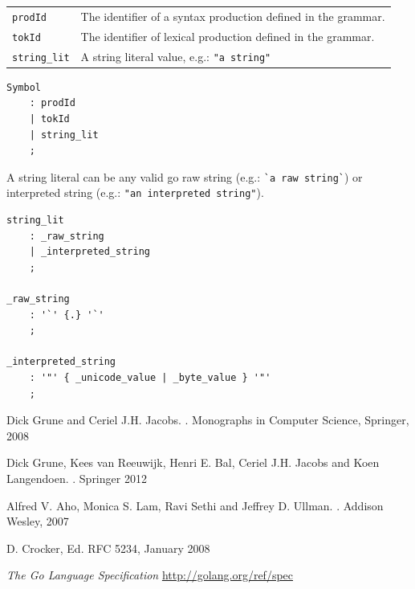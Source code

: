 \documentclass[12pt]{article}
\begin{document}
\begin{longtable}{ll}
	\verb|prodId| & The identifier of a syntax production defined in the grammar. \\
	\verb|tokId| & The identifier of lexical production defined in the grammar. \\
	\verb|string_lit| & A string literal value, e.g.: \verb|"a string"| \\
\end{longtable}

\begin{Verbatim}[frame=single]
Symbol
    : prodId
    | tokId
    | string_lit
    ;
\end{Verbatim}

A string literal can be any valid go raw string (e.g.: \verb|`a raw string`|) or interpreted string (e.g.: \verb|"an interpreted string"|).

\begin{Verbatim}[frame=single]
string_lit
    : _raw_string
    | _interpreted_string
    ;

_raw_string
    : '`' {.} '`'
    ;

_interpreted_string
    : '"' { _unicode_value | _byte_value } '"'
    ;
\end{Verbatim}




\nocite{Parsing, Modern Compiler Design, Dragon Book, ABNF}
\begin{thebibliography}{99}
	Dick Grune and Ceriel J.H. Jacobs.
	.
	\newblock Monographs in Computer Science, Springer, 2008

	Dick Grune, Kees van Reeuwijk, Henri E. Bal, Ceriel J.H. Jacobs and Koen Langendoen.
	.
	\newblock Springer 2012

	Alfred V. Aho, Monica S. Lam, Ravi Sethi and Jeffrey D. Ullman.
	.
	\newblock Addison Wesley, 2007

	D. Crocker, Ed.
	\newblock RFC 5234, January 2008

	{\em The Go Language Specification}
	\newblock \url{http://golang.org/ref/spec}


\end{thebibliography}
\end{document}
